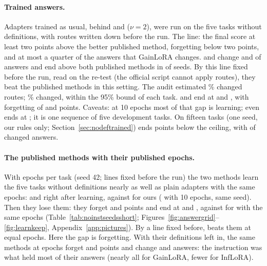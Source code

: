 \paragraph{Trained answers.} Adapters trained as usual, behind \recog{} and \handicap{} ($\nu = 2$), were run on the
five tasks without definitions, with routes written down before the run. The line: the final score at
least two points above the better published method, forgetting below two points, and at most a
quarter of the answers that GainLoRA changes. \recog{} and \handicap{} change \AudSeedsRidgeChanged{} and
\AudSeedsHandicapChanged{} of \AudSeedsCompared{} answers and end above both published methods in
\AudSeedsRidgeAboveInAll{} of \AudSeedsN{} seeds. By this line fixed before the run, read on the re-test (the official script
cannot apply routes), they beat the published methods in this setting. The audit estimated
\AudRouteFiveRidgeFirstFourAuditEst{}\% changed routes; \AudRouteFiveRidgeChangedShare{}\% changed,
within the 95\% bound of each task. \recog{} and \handicap{} end at \AudSeedsRidgeAPOne{} and
\AudSeedsHandicapAPOne{}, with forgetting of \AudSeedsRidgeFT{} and \AudSeedsHandicapFT{} points. Caveats: at 10 epochs most of that gap is learning; even \centre{} ends at \AudSeedsCentreAPOne{}; it is one
sequence of five development tasks. On fifteen tasks (one seed, our rules only;
Section~\ref{sec:nodeftrained}) \recog{} ends \AudFifteenNoDefRidgeBelowOwn{} points below the ceiling, with
\AudFifteenNoDefRidgeChanged{} of \AudFifteenNoDefCompared{} changed answers.

\paragraph{The published methods with their published epochs.} With \AudFullEpochs{} epochs per
task (seed 42; lines fixed before the run) the two methods learn the five tasks without definitions nearly as well as plain adapters with the same epochs:
\AudFullInfloraLearnedOne{} and \AudFullGainloraLearnedOne{} right after learning, against
\AudFullOursRidgeLearnedOne{} for ours (\AudOursRidgeLearnedOne{} with 10 epochs, same seed). Then they lose them: they forget \AudFullInfloraFTInt{}
and \AudFullGainloraFTInt{} points and end at \AudFullInfloraAPOne{} and \AudFullGainloraAPOne{}, against
\AudFullOursRidgeAPOne{} for \recog{} with the same \AudFullEpochs{} epochs (Table~\ref{tab:noinstseedsshort}; Figures~\ref{fig:answergrid}--\ref{fig:learnkeep}, Appendix~\ref{app:pictures}). By a line fixed before, \recog{} beats them at equal epochs.
Here the gap is forgetting. With their definitions left in, the same methods at \AudFullEpochs{} epochs forget \AudFullDefOriginalInfloraFTOne{} and
\AudFullDefOriginalGainloraFTOne{} points and change \AudFullDefOriginalInfloraChanged{} and \AudFullDefOriginalGainloraChanged{} answers: the instruction was what held most of their answers (nearly all for GainLoRA, fewer for InfLoRA).

